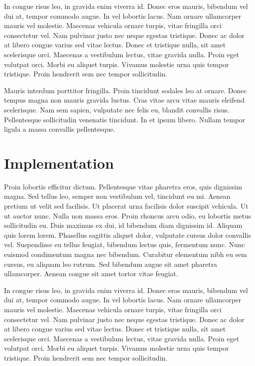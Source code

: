 \documentclass{article}
\begin{document}
\begin{question}
	In congue risus leo, in gravida enim viverra id. Donec eros mauris, bibendum vel dui at, tempor commodo augue. In vel lobortis lacus. Nam ornare ullamcorper mauris vel molestie. Maecenas vehicula ornare turpis, vitae fringilla orci consectetur vel. Nam pulvinar justo nec neque egestas tristique. Donec ac dolor at libero congue varius sed vitae lectus. Donec et tristique nulla, sit amet scelerisque orci. Maecenas a vestibulum lectus, vitae gravida nulla. Proin eget volutpat orci. Morbi eu aliquet turpis. Vivamus molestie urna quis tempor tristique. Proin hendrerit sem nec tempor sollicitudin.
\end{question}

Mauris interdum porttitor fringilla. Proin tincidunt sodales leo at ornare. Donec tempus magna non mauris gravida luctus. Cras vitae arcu vitae mauris eleifend scelerisque. Nam sem sapien, vulputate nec felis eu, blandit convallis risus. Pellentesque sollicitudin venenatis tincidunt. In et ipsum libero. Nullam tempor ligula a massa convallis pellentesque.


\section{Implementation}

Proin lobortis efficitur dictum. Pellentesque vitae pharetra eros, quis dignissim magna. Sed tellus leo, semper non vestibulum vel, tincidunt eu mi. Aenean pretium ut velit sed facilisis. Ut placerat urna facilisis dolor suscipit vehicula. Ut ut auctor nunc. Nulla non massa eros. Proin rhoncus arcu odio, eu lobortis metus sollicitudin eu. Duis maximus ex dui, id bibendum diam dignissim id. Aliquam quis lorem lorem. Phasellus sagittis aliquet dolor, vulputate cursus dolor convallis vel. Suspendisse eu tellus feugiat, bibendum lectus quis, fermentum nunc. Nunc euismod condimentum magna nec bibendum. Curabitur elementum nibh eu sem cursus, eu aliquam leo rutrum. Sed bibendum augue sit amet pharetra ullamcorper. Aenean congue sit amet tortor vitae feugiat.

In congue risus leo, in gravida enim viverra id. Donec eros mauris, bibendum vel dui at, tempor commodo augue. In vel lobortis lacus. Nam ornare ullamcorper mauris vel molestie. Maecenas vehicula ornare turpis, vitae fringilla orci consectetur vel. Nam pulvinar justo nec neque egestas tristique. Donec ac dolor at libero congue varius sed vitae lectus. Donec et tristique nulla, sit amet scelerisque orci. Maecenas a vestibulum lectus, vitae gravida nulla. Proin eget volutpat orci. Morbi eu aliquet turpis. Vivamus molestie urna quis tempor tristique. Proin hendrerit sem nec tempor sollicitudin.
\end{document}
